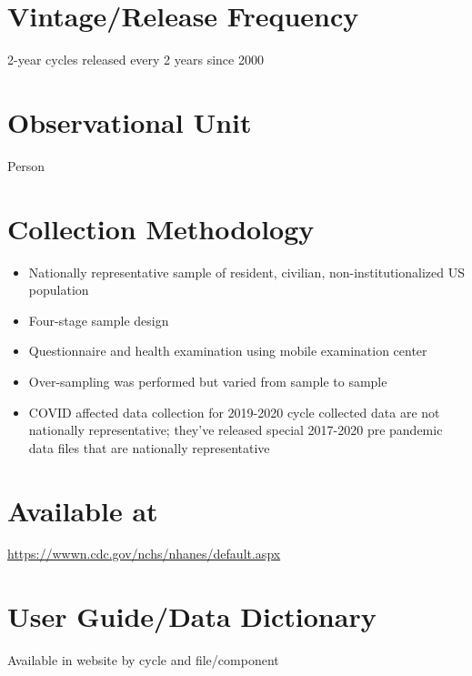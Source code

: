 \documentclass[
]{book}
\providecommand{\tightlist}{%
  \setlength{\itemsep}{0pt}\setlength{\parskip}{0pt}}
\begin{document}
\hypertarget{vintagerelease-frequency-49}{%
\section{Vintage/Release Frequency}\label{vintagerelease-frequency-49}}

2-year cycles released every 2 years since 2000

\hypertarget{observational-unit-49}{%
\section{Observational Unit}\label{observational-unit-49}}

Person

\hypertarget{collection-methodology-49}{%
\section{Collection Methodology}\label{collection-methodology-49}}

\begin{itemize}
\tightlist
\item
  Nationally representative sample of resident, civilian, non-institutionalized US population
\item
  Four-stage sample design
\item
  Questionnaire and health examination using mobile examination center
\item
  Over-sampling was performed but varied from sample to sample
\item
  COVID affected data collection for 2019-2020 cycle collected data are not nationally representative; they've released special 2017-2020 pre pandemic data files that are nationally representative
\end{itemize}

\hypertarget{available-at-49}{%
\section{Available at}\label{available-at-49}}

\url{https://wwwn.cdc.gov/nchs/nhanes/default.aspx}

\hypertarget{user-guidedata-dictionary-49}{%
\section{User Guide/Data Dictionary}\label{user-guidedata-dictionary-49}}

Available in website by cycle and file/component
\end{document}
